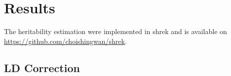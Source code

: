 	\section{Results}
		The heritability estimation were implemented in \gls{shrek} and is available on \url{https://github.com/choishingwan/shrek}.  
		\subsection{LD Correction}
		\begin{figure}
			\centering
\end{figure}
